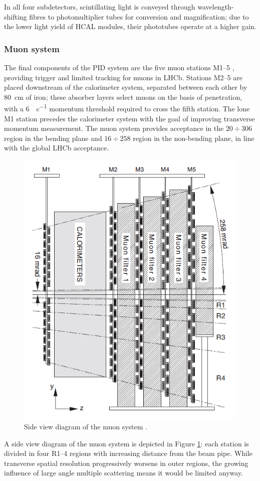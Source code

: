 In all four subdetectors, scintillating light is conveyed through wavelength-shifting fibres to photomultiplier tubes for conversion and magnification; due to the lower light yield of HCAL modules, their phototubes operate at a higher gain.

\subsubsection{Muon system}

The final components of the PID system are the five muon stations M1--5 \cite{Barbosa-Marinho:504326}, providing trigger and limited tracking for muons in LHCb.
Stations M2--5 are placed downstream of the calorimeter system, separated between each other by \SI{80}{\centi\meter} of iron;
these absorber layers select muons on the basis of penetration, with a \SI{6}{\gev\per c} momentum threshold required to cross the fifth station.
The lone M1 station precedes the calorimeter system with the goal of improving transverse momentum measurement.
The muon system provides acceptance in the $20 \div 306$ \si{\mrad} region in the bending plane and $16 \div 258$ \si{\mrad} region in the non-bending plane, in line with the global LHCb acceptance.

\begin{figure}[t]
	\centering
	\includegraphics[width=.5\textwidth]{graphics/02-lhcb/muon_side_view.png}
	\caption[Side view diagram of the muon system.]{Side view diagram of the muon system \cite{Alves:1129809}.}
	\label{fig:2:muon_side_view}
\end{figure}


A side view diagram of the muon system is depicted in Figure \ref{fig:2:muon_side_view}: each station is divided in four R1--4 regions with increasing distance from the beam pipe.
While transverse spatial resolution progressively worsens in outer regions, the growing influence of large angle multiple scattering means it would be limited anyway.

